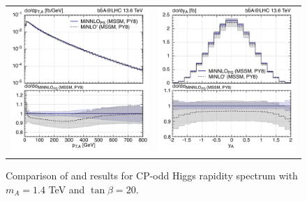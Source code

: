 \documentclass[11pt,a4paper]{article}
\begin{document}
\begin{figure}[t!]
\begin{center}
\begin{tabular}{cc}
\includegraphics[width=.45\textwidth, page=1]{plots/5fs/BSM/pt_Higgs__A-1400GeV-PY8-kQ0.pdf}&
\includegraphics[width=.45\textwidth, page=1]{plots/5fs/BSM/y_Higgs__A-1400GeV-PY8-kQ0.pdf}
\end{tabular}
\vspace*{1ex}
\caption{Comparison of \minlo{} and \minnlo{} results for CP-odd Higgs rapidity spectrum with $m_A=1.4$ TeV and $\tan\beta=20$. \label{fig:MiNLOBSM}}
\end{center}
\end{figure}
\end{document}

